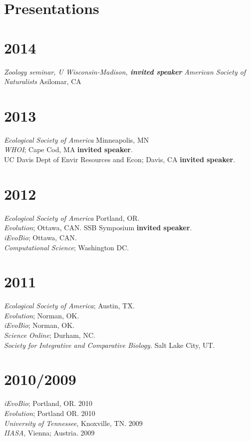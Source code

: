 \documentclass[margin]{res}
\begin{document}
\begin{resume}
\section{Presentations} 
\section{\textnormal{2014}}
  \emph{Zoology seminar, U Wisconsin-Madison, \textbf{invited speaker}}
  \emph{American Society of Naturalists} Asilomar, CA \\ 
\section{\textnormal{2013}}
  \emph{Ecological Society of America} Minneapolis, MN \\ 
  \emph{WHOI}; Cape Cod, MA \textbf{invited speaker}.\\
  UC Davis Dept of Envir Resources and Econ; Davis, CA \textbf{invited speaker}.\\
\section{\textnormal{2012}}
  \emph{Ecological Society of America} Portland, OR. \\ 
  \emph{Evolution}; Ottawa, CAN. SSB Symposium \textbf{invited speaker}.\\
  \emph{iEvoBio}; Ottawa, CAN. \\
  \emph{Computational Science}; Washington DC. 
\section{\textnormal{2011}}
  \emph{Ecological Society of America}; Austin, TX. \\
  \emph{Evolution}; Norman, OK. \\
  \emph{iEvoBio}; Norman, OK. \\
  \emph{Science Online}; Durham, NC.\\
  \emph{Society for Integrative and Comparative Biology.} Salt Lake City, UT. \\
 \section{\textnormal{2010/2009}}
  \emph{iEvoBio}; Portland, OR. 2010 \\
  \emph{Evolution}; Portland OR. 2010 \\
  \emph{University of Tennessee}, Knoxville, TN. 2009 \\
  \emph{IIASA}, Vienna; Austria. 2009



\end{resume}
\end{document}
